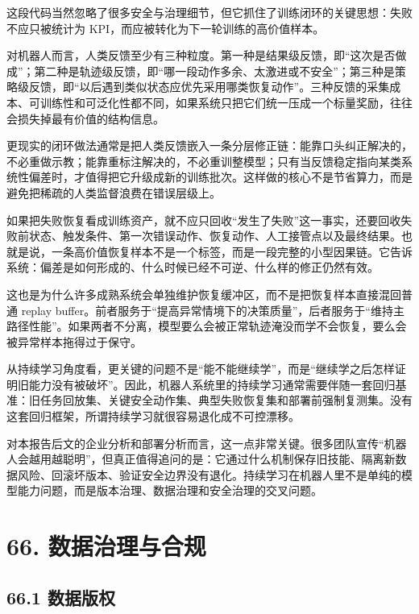 这段代码当然忽略了很多安全与治理细节，但它抓住了训练闭环的关键思想：失败不应只被统计为 KPI，而应被转化为下一轮训练的高价值样本。

对机器人而言，人类反馈至少有三种粒度。第一种是结果级反馈，即“这次是否做成”；第二种是轨迹级反馈，即“哪一段动作多余、太激进或不安全”；第三种是策略级反馈，即“以后遇到类似状态应优先采用哪类恢复动作”。三种反馈的采集成本、可训练性和可泛化性都不同，如果系统只把它们统一压成一个标量奖励，往往会损失掉最有价值的结构信息。

更现实的闭环做法通常是把人类反馈嵌入一条分层修正链：能靠口头纠正解决的，不必重做示教；能靠重标注解决的，不必重训整模型；只有当反馈稳定指向某类系统性偏差时，才值得把它升级成新的训练批次。这样做的核心不是节省算力，而是避免把稀疏的人类监督浪费在错误层级上。

如果把失败恢复看成训练资产，就不应只回收“发生了失败”这一事实，还要回收失败前状态、触发条件、第一次错误动作、恢复动作、人工接管点以及最终结果。也就是说，一条高价值恢复样本不是一个标签，而是一段完整的小型因果链。它告诉系统：偏差是如何形成的、什么时候已经不可逆、什么样的修正仍然有效。

这也是为什么许多成熟系统会单独维护恢复缓冲区，而不是把恢复样本直接混回普通 replay buffer。前者服务于“提高异常情境下的决策质量”，后者服务于“维持主路径性能”。如果两者不分离，模型要么会被正常轨迹淹没而学不会恢复，要么会被异常样本拖得过于保守。

从持续学习角度看，更关键的问题不是“能不能继续学”，而是“继续学之后怎样证明旧能力没有被破坏”。因此，机器人系统里的持续学习通常需要伴随一套回归基准：旧任务回放集、关键安全动作集、典型失败恢复集和部署前强制复测集。没有这套回归框架，所谓持续学习就很容易退化成不可控漂移。

对本报告后文的企业分析和部署分析而言，这一点非常关键。很多团队宣传“机器人会越用越聪明”，但真正值得追问的是：它通过什么机制保存旧技能、隔离新数据风险、回滚坏版本、验证安全边界没有退化。持续学习在机器人里不是单纯的模型能力问题，而是版本治理、数据治理和安全治理的交叉问题。

\section*{66. 数据治理与合规}

\subsection*{66.1 数据版权}



